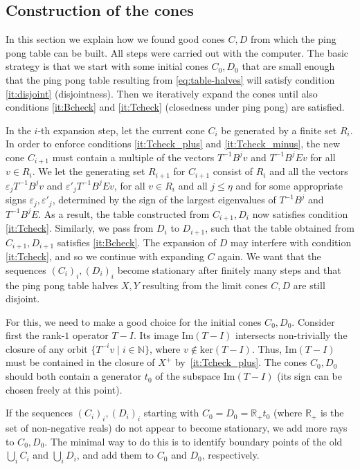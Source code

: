 \documentclass[11pt,a4paper]{amsart}
\theoremstyle{definition}
\theoremstyle{definition}
\numberwithin{equation}{section}
\begin{document}
\subsection{Construction of the cones}\label{se:construction}

In this section we explain how we found good cones $C,D$ from which the ping pong table can be built. All steps were carried out with the computer.
The basic strategy is that we start with some initial cones $C_0,D_0$ that are small enough that the ping pong table resulting from \eqref{eq:table-halves} will satisfy condition \eqref{it:disjoint} (disjointness). Then we iteratively expand the cones until also conditions \eqref{it:Bcheck} and \eqref{it:Tcheck} (closedness under ping pong) are satisfied.

In the $i$-th expansion step, let the current cone $C_i$ be generated by a finite set $R_i$.
In order to enforce conditions \eqref{it:Tcheck_plus} and \eqref{it:Tcheck_minus}, the new cone $C_{i+1}$ must contain a multiple of the vectors $T^{-1}B^{j}v$ and $T^{-1}B^{j}Ev$ for all $v\in R_{i}$.
We let the generating set $R_{i+1}$ for $C_{i+1}$ consist of $R_{i}$ and all the vectors $\varepsilon_{j}T^{-1}B^{j}v$ and $\varepsilon'_{j}T^{-1}B^{j}Ev$, for all $v\in R_{i}$ and all $j\leq\eta$ and for some appropriate signs $\varepsilon_{j},\varepsilon'_{j}$, determined by the sign of the largest eigenvalues of $T^{-1}B^{j}$ and $T^{-1}B^{j}E$. As a result, the table constructed from $C_{i+1},D_i$ now satisfies condition \eqref{it:Tcheck}. Similarly, we pass from $D_i$ to $D_{i+1}$, such that the table obtained from $C_{i+1},D_{i+1}$ satisfies \eqref{it:Bcheck}. The expansion of $D$ may interfere with condition \eqref{it:Tcheck}, and so we continue with expanding $C$ again. We want that the sequences $(C_i)_{i},(D_i)_{i}$ become stationary after finitely many steps and that the ping pong table halves $X,Y$ resulting from the limit cones $C,D$ are still disjoint.

For this, we need to make a good choice for the initial cones $C_0,D_0$.
Consider first the rank-$1$ operator $T-I$. Its image $\mathrm{Im}(T-I)$ intersects non-trivially the closure of any orbit $\{T^{-i}v\mid i\in\mathbb{N}\}$, where $v\notin\mathrm{ker}(T-I)$. Thus, $\mathrm{Im}(T-I)$ must be contained in the closure of $X^{+}$ by~\eqref{it:Tcheck_plus}.
The cones $C_0,D_0$ should both contain a generator $t_0$ of the subspace $\mathrm{Im}(T-I)$ (its sign can be chosen freely at this point).

If the sequences $(C_i)_{i},(D_i)_{i}$ starting with $C_0=D_0=\mathbb{R}_{+}t_0$ (where $\mathbb{R}_{+}$ is the set of non-negative reals) do not appear to become stationary, we add more rays to $C_0,D_0$. The minimal way to do this is to identify boundary points of the old $\bigcup_{i}C_i$ and $\bigcup_{i}D_i$, and add them to $C_0$ and $D_0$, respectively.
\end{document}
